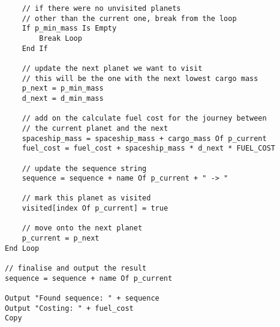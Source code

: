 \documentclass[
]{article}
\begin{document}
\begin{verbatim}
    // if there were no unvisited planets
    // other than the current one, break from the loop
    If p_min_mass Is Empty
        Break Loop
    End If

    // update the next planet we want to visit
    // this will be the one with the next lowest cargo mass
    p_next = p_min_mass
    d_next = d_min_mass

    // add on the calculate fuel cost for the journey between
    // the current planet and the next
    spaceship_mass = spaceship_mass + cargo_mass Of p_current
    fuel_cost = fuel_cost + spaceship_mass * d_next * FUEL_COST

    // update the sequence string
    sequence = sequence + name Of p_current + " -> "

    // mark this planet as visited
    visited[index Of p_current] = true

    // move onto the next planet
    p_current = p_next
End Loop

// finalise and output the result
sequence = sequence + name Of p_current

Output "Found sequence: " + sequence
Output "Costing: " + fuel_cost
Copy
\end{verbatim}
\end{document}
